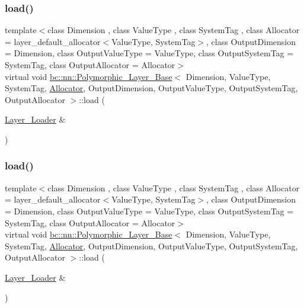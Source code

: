 \subsubsection{\texorpdfstring{load()}{load()}\hspace{0.1cm}{\footnotesize\ttfamily [1/2]}}
{\footnotesize\ttfamily template$<$class Dimension , class Value\+Type , class System\+Tag , class Allocator  = layer\+\_\+default\+\_\+allocator$<$\+Value\+Type, System\+Tag$>$, class Output\+Dimension  = Dimension, class Output\+Value\+Type  = Value\+Type, class Output\+System\+Tag  = System\+Tag, class Output\+Allocator  = Allocator$>$ \\
virtual void \hyperlink{structbc_1_1nn_1_1Polymorphic__Layer__Base}{bc\+::nn\+::\+Polymorphic\+\_\+\+Layer\+\_\+\+Base}$<$ Dimension, Value\+Type, System\+Tag, \hyperlink{classbc_1_1allocators_1_1Allocator}{Allocator}, Output\+Dimension, Output\+Value\+Type, Output\+System\+Tag, Output\+Allocator $>$\+::load (\begin{DoxyParamCaption}\item[{\hyperlink{structbc_1_1nn_1_1Layer__Loader}{Layer\+\_\+\+Loader} \&}]{ }\end{DoxyParamCaption})\hspace{0.3cm}{\ttfamily [pure virtual]}}

\mbox{\label{structbc_1_1nn_1_1Polymorphic__Layer__Base_ab22a722386024a1329715e738d57814c}} 
\subsubsection{\texorpdfstring{load()}{load()}\hspace{0.1cm}{\footnotesize\ttfamily [2/2]}}
{\footnotesize\ttfamily template$<$class Dimension , class Value\+Type , class System\+Tag , class Allocator  = layer\+\_\+default\+\_\+allocator$<$\+Value\+Type, System\+Tag$>$, class Output\+Dimension  = Dimension, class Output\+Value\+Type  = Value\+Type, class Output\+System\+Tag  = System\+Tag, class Output\+Allocator  = Allocator$>$ \\
virtual void \hyperlink{structbc_1_1nn_1_1Polymorphic__Layer__Base}{bc\+::nn\+::\+Polymorphic\+\_\+\+Layer\+\_\+\+Base}$<$ Dimension, Value\+Type, System\+Tag, \hyperlink{classbc_1_1allocators_1_1Allocator}{Allocator}, Output\+Dimension, Output\+Value\+Type, Output\+System\+Tag, Output\+Allocator $>$\+::load (\begin{DoxyParamCaption}\item[{\hyperlink{structbc_1_1nn_1_1Layer__Loader}{Layer\+\_\+\+Loader} \&}]{ }\end{DoxyParamCaption})\hspace{0.3cm}{\ttfamily [pure virtual]}}

